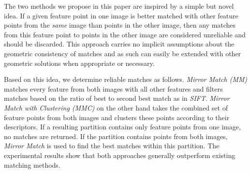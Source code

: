 The two methods we propose in this paper are inspired by a simple but 
novel idea. If a given feature point in one image is better matched with 
other feature points from the \emph{same} image than points in the other 
image, then any matches from this feature point to points in the other 
image are considered unreliable and should be discarded.  This approach 
carries no implicit assumptions about the geometric consistency of 
matches and as such can easily be extended with other geometric 
solutions when appropriate or necessary.

Based on this idea,  we determine reliable matches as follows. 
\emph{Mirror Match (MM)} matches every feature from both images with all 
other features and filters matches based on the ratio of best to second 
best match as in \emph{SIFT}. \emph{Mirror Match with Clustering (MMC)} 
on the other hand takes the combined set of feature points from both 
images and clusters these points according to their descriptors.  If a 
resulting partition contains only feature points from one image, no 
matches are returned.  If the partition contains points from both 
images, \emph{Mirror Match} is used to find the best matches within this 
partition.  The experimental results show that both approaches generally 
outperform existing matching methods.
